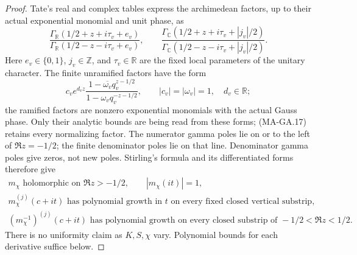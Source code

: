 \begin{proof}
Tate's real and complex tables express the archimedean
factors, up to their actual exponential monomial and unit
phase, as
\[
 \frac{\Gamma_{\mathbb R}(1/2+z+i\tau_v+e_v)}
      {\Gamma_{\mathbb R}(1/2-z-i\tau_v+e_v)},
 \qquad
 \frac{\Gamma_{\mathbb C}(1/2+z+i\tau_v+|j_v|/2)}
      {\Gamma_{\mathbb C}(1/2-z-i\tau_v+|j_v|/2)}.
 \tag{MA-GA.18}
\]
Here $e_v\in\{0,1\}$, $j_v\in\mathbb Z$, and
$\tau_v\in\mathbb R$ are the fixed local parameters of
the unitary character.  The finite unramified factors have
the form
\[
 c_v e^{d_vz}
    \frac{1-\overline{\omega_v}q_v^{z-1/2}}
         {1-\omega_v q_v^{-z-1/2}},
 \qquad |c_v|=|\omega_v|=1,\quad d_v\in\mathbb R;
 \tag{MA-GA.19}
\]
the ramified factors are nonzero exponential monomials
with the actual Gauss phase.  Only their analytic bounds
are being read from these forms; (MA-GA.17) retains every
normalizing factor.  The numerator gamma poles lie on or
to the left of $\Re z=-1/2$; the finite denominator poles
lie on that line.  Denominator gamma poles give zeros,
not new poles.  Stirling's formula and its differentiated
forms therefore give
\[
 \begin{gathered}
 m_\chi\text{ holomorphic on }\Re z>-1/2,\qquad
 |m_\chi(it)|=1,\\
 m_\chi^{(j)}(c+it)\text{ has polynomial growth in }t
       \text{ on every fixed closed vertical substrip},\\
 (m_\chi^{-1})^{(j)}(c+it)\text{ has polynomial growth
       on every closed substrip of }-1/2<\Re z<1/2.
 \end{gathered}
 \tag{MA-GA.20}
\]
There is no uniformity claim as $K,S,\chi$ vary.  Polynomial
bounds for each derivative suffice below.


\end{proof}
